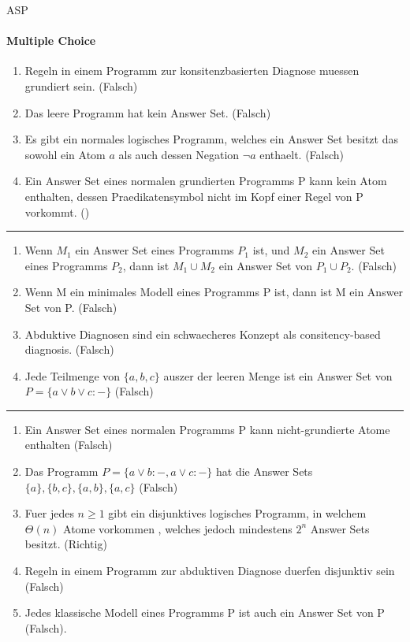 \documentclass[a4paper,oneside,10pt,DIV12,headsepline,footexclude,headexclude]{scrartcl}
\begin{document}
\begin{section}{ASP}
    \paragraph {Multiple Choice}
        \begin{enumerate}
            \item Regeln in einem Programm zur konsitenzbasierten Diagnose muessen grundiert sein. (Falsch)
            \item Das leere Programm hat kein Answer Set. (Falsch)
            \item Es gibt ein normales logisches Programm, welches ein Answer Set besitzt das sowohl
            ein Atom $a$ als auch dessen Negation $\neg a$ enthaelt. (Falsch)
            \item Ein Answer Set eines normalen grundierten Programms P kann kein Atom enthalten,
            dessen Praedikatensymbol nicht im Kopf einer Regel von P vorkommt. ()
        \end{enumerate}    
    \rule{\textwidth}{1pt}        
    \begin{enumerate}
            \item
            Wenn $M_1$ ein Answer Set eines Programms $P_1$ ist, und $M_2$ ein
            Answer Set eines Programms $P_2$, dann ist $M_1 \cup M_2$ ein Answer Set von $P_1 \cup P_2$. (Falsch)
            \item Wenn M ein minimales Modell eines Programms P ist, dann ist M ein Answer Set von P. (Falsch)
            \item Abduktive Diagnosen sind ein schwaecheres Konzept als consitency-based diagnosis. (Falsch)
            \item Jede Teilmenge von $\{a,b,c\}$ auszer der leeren Menge ist ein Answer Set von $P = \{a \vee b \vee c :-\}$ (Falsch)
        \end{enumerate}    
    \rule{\textwidth}{1pt}        
    \begin{enumerate}
        \item Ein Answer Set eines normalen Programms P kann nicht-grundierte Atome enthalten (Falsch)
        \item Das Programm $P = \{a \vee b :-, a \vee c :-\}$ hat die Answer Sets $\{a\}, \{b,c\}, \{a,b\}, \{a,c\}$ (Falsch)
        \item Fuer jedes $n \geq 1$ gibt ein disjunktives logisches Programm, in welchem $\Theta (n)$ Atome vorkommen
        , welches jedoch mindestens $2^n$ Answer Sets besitzt. (Richtig)
        \item Regeln in einem Programm zur abduktiven Diagnose duerfen disjunktiv sein (Falsch)
        \item Jedes klassische Modell eines Programms P ist auch ein Answer Set von P (Falsch).
   \end{enumerate}


\end{section}
\end{document}

